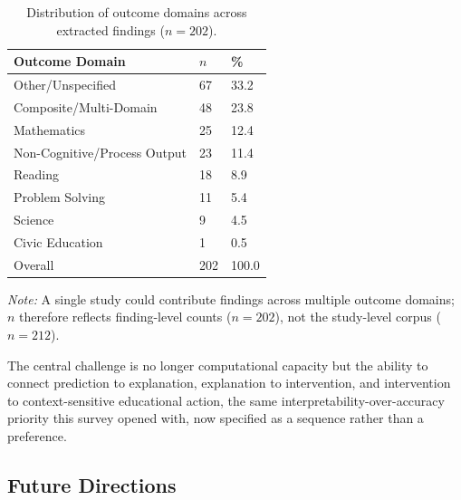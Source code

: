 \documentclass{ieeeaccess}
\begin{document}
\begin{table}[!t]
\centering
\small
\caption{Distribution of outcome domains across extracted findings ($n = 202$).}
\label{tab:outcome-domains}
\begin{tabular}{p{5cm} p{1cm} p{1cm}}
\toprule
Outcome Domain & $n$ & \% \\
\midrule
Other/Unspecified            & 67  & 33.2 \\
Composite/Multi-Domain       & 48  & 23.8 \\
Mathematics                  & 25  & 12.4 \\
Non-Cognitive/Process Output & 23  & 11.4 \\
Reading                      & 18  &  8.9 \\
Problem Solving              & 11  &  5.4 \\
Science                      &  9  &  4.5 \\
Civic Education              &  1  &  0.5 \\
\midrule
Overall                      & 202 & 100.0 \\
\bottomrule
\end{tabular}
\par\vspace{4pt}
\footnotesize\textit{Note:} A single study could contribute findings across multiple outcome domains; $n$ therefore reflects finding-level counts ($n = 202$), not the study-level corpus ($n = 212$).
\end{table}

The central challenge is no longer computational capacity but the ability to connect prediction to explanation, explanation to intervention, and intervention to context-sensitive educational action, the same interpretability-over-accuracy priority this survey opened with, now specified as a sequence rather than a preference.

\subsection{Future Directions}
\label{future-directions}
\end{document}
